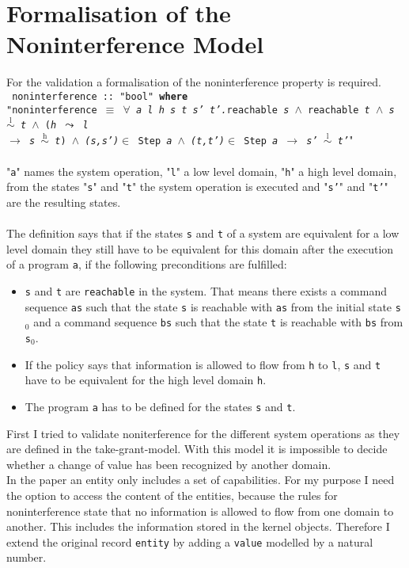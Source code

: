 \chapter{Formalisation of the Noninterference Model}\label{FormNon}
For the validation a formalisation of the noninterference property is required. \\ 

{
\texttt{
noninterference :: "bool" \textbf{where} \\
"noninterference $\equiv$ $\forall$ \textit{a l h s t s' t'.}reachable \textit{s} $\wedge$ reachable \textit{t} $\wedge$ \textit{s $\overset{\text{l}}{\sim}$ t} $\wedge$ (\textit{h $\leadsto$ l \\
$\longrightarrow$ s $\overset{\text{h}}{\sim}$ t}) $\wedge$ \textit{(s,s')}$\in$ Step \textit{a} $\wedge$ \textit{(t,t')}$\in$ Step \textit{a} $\longrightarrow$ \textit{s' $\overset{\text{l}}{\sim}$ t'}}"} \\ \\
"\texttt{a}" names the system operation, "\texttt{l}" a low level domain, "\texttt{h}" a high level domain, from the states "\texttt{s}" and "\texttt{t}" the system operation is executed and "\texttt{s'}" and "\texttt{t'}" are the resulting states. \\ \\
The definition says that if the states \texttt{s} and \texttt{t} of a system are equivalent for a low level domain they still have to be equivalent for this domain after the execution of a program \texttt{a}, if the following preconditions are fulfilled: 
\begin{itemize}
\item \texttt{s} and \texttt{t} are \texttt{reachable} in the system. That means there exists a command sequence \texttt{as} such that the state \texttt{s} is reachable with \texttt{as} from the initial state \texttt{s$_0$} and a command sequence \texttt{bs} such that the state \texttt{t} is reachable with \texttt{bs} from \texttt{s$_0$}.
\item If the policy says that information is allowed to flow from \texttt{h} to \texttt{l}, \texttt{s} and \texttt{t} have to be equivalent for the high level domain \texttt{h}.
\item The program \texttt{a} has to be defined for the states \texttt{s} and \texttt{t}.
\end{itemize} 
First I tried to validate noniterference for the different system operations as they are defined in the take-grant-model. With this model it is impossible to decide whether a change of value has been recognized by another domain. \\
In the paper an entity only includes a set of capabilities. For my purpose I need the option to access the content of the entities, because the rules for noninterference state that no information is allowed to flow from one domain to another. This includes the information stored in the kernel objects. 
Therefore I extend the original record \texttt{entity} by adding a \texttt{value} modelled by a natural number. \\ 


